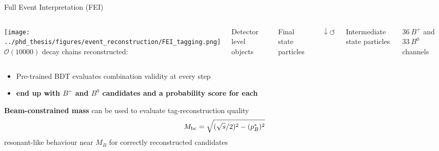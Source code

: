 \documentclass[xcolor=dvipsnames]{beamer}
\begin{document}
   \begin{frame}{Full Event Interpretation (FEI)}
      \scriptsize\centering
   \begin{columns}
         \texttt{[image: ../phd\_thesis/figures/event\_reconstruction/FEI\_tagging.png]}
      \centering
      $\mathcal{O}(10000)$ decay chains reconstructed:
      
         Detector level objects

         \downdownarrows	

         Final state particles

         $\downarrow\circlearrowleft$	

         Intermediate state particles \circlearrowleft	

         \downdownarrows	

         $36~B^+$ and $33~B^0$ channels
      
   \end{columns}
   \vspace{5pt}
\begin{itemize}
   \item Pre-trained BDT evaluates combination validity at every step
   \item[\ra]\textbf{end up with $B^+$ and $B^0$ candidates and a probability score \feiProb for each}
\end{itemize}   

\vspace{10pt}

\textbf{Beam-constrained mass} can be used to evaluate tag-reconstruction quality
\vspace{-5pt}
\begin{equation*}
{\ensuremath{M_{\mathrm{bc}}}} = \sqrt{(\sqrt{s}/2)^2 - (p^*_B)^2}
\end{equation*}
\ra resonant-like behaviour near $M_B$ for correctly reconstructed candidates

\end{frame}
\end{document}
